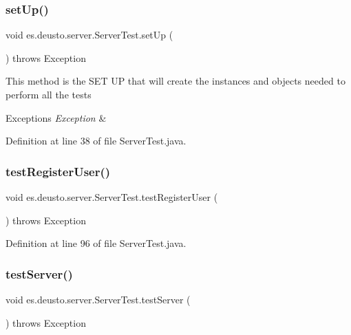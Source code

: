\subsubsection{\texorpdfstring{set\+Up()}{setUp()}}
{\footnotesize\ttfamily void es.\+deusto.\+server.\+Server\+Test.\+set\+Up (\begin{DoxyParamCaption}{ }\end{DoxyParamCaption}) throws Exception}

This method is the S\+ET UP that will create the instances and objects needed to perform all the tests 
\begin{DoxyExceptions}{Exceptions}
{\em Exception} & \\
\hline
\end{DoxyExceptions}


Definition at line 38 of file Server\+Test.\+java.

\mbox{\label{classes_1_1deusto_1_1server_1_1_server_test_ab50ebca6957682f2a7e6e51dc06278cf}} 
\subsubsection{\texorpdfstring{test\+Register\+User()}{testRegisterUser()}}
{\footnotesize\ttfamily void es.\+deusto.\+server.\+Server\+Test.\+test\+Register\+User (\begin{DoxyParamCaption}{ }\end{DoxyParamCaption}) throws Exception}



Definition at line 96 of file Server\+Test.\+java.

\mbox{\label{classes_1_1deusto_1_1server_1_1_server_test_a9c697e77e1422a1d0835f6e6a38036f4}} 
\subsubsection{\texorpdfstring{test\+Server()}{testServer()}}
{\footnotesize\ttfamily void es.\+deusto.\+server.\+Server\+Test.\+test\+Server (\begin{DoxyParamCaption}{ }\end{DoxyParamCaption}) throws Exception}

